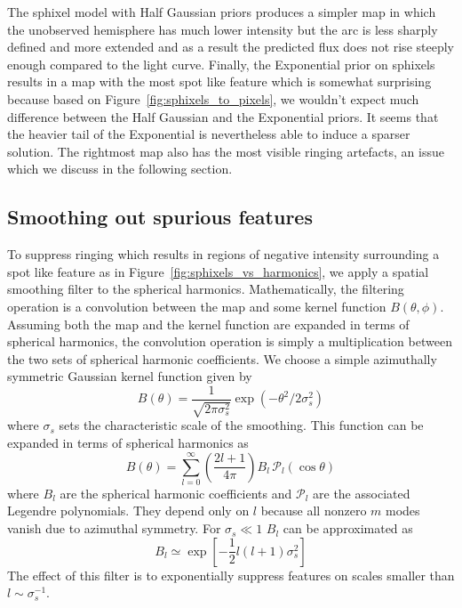 \documentclass[modern]{aastex62}
\begin{document}
The sphixel model with Half Gaussian priors produces a simpler map in which the unobserved hemisphere has much lower intensity but the arc is less sharply defined and more extended and as a result the predicted flux does not rise steeply enough compared to the light curve.
Finally, the Exponential prior on sphixels results in a map with the most spot like feature 
which is somewhat surprising because based on Figure~\ref{fig:sphixels_to_pixels}, we wouldn't expect much difference between the Half Gaussian and the Exponential priors.
It seems that the heavier tail of the Exponential is nevertheless able to induce a sparser solution.
The rightmost map also has the most visible ringing artefacts, an issue which we discuss in the following section.

\subsection{Smoothing out spurious features}
\label{ssec:spurious_features}
To suppress ringing which results in regions of negative intensity surrounding a spot like feature as in Figure~\ref{fig:sphixels_vs_harmonics}, we apply a spatial smoothing filter to the spherical harmonics.
Mathematically, the filtering operation is a convolution between the map and some kernel function $B(\theta,\phi)$.
Assuming both the map and the kernel function are expanded in terms of spherical harmonics, the convolution operation is simply a multiplication between the two sets of spherical harmonic coefficients.
We choose a simple azimuthally symmetric Gaussian kernel function given by
\begin{equation}
    B(\theta)=\frac{1}{\sqrt{2 \pi \sigma_s^{2}}}\exp \left(-\theta^{2} / 2 \sigma_s^{2}\right)
\end{equation}
where $\sigma_s$ sets the characteristic scale of the smoothing.
This function can be expanded in terms of spherical harmonics as
\begin{equation}
    B(\theta)=\sum_{l=0}^{\infty}\left(\frac{2 l+1}{4 \pi}\right) B_{l} \,\mathcal{P}_{l}(\cos \theta)
\end{equation}
where $B_l$ are the spherical harmonic coefficients and $\mathcal{P}_l$ are the associated Legendre polynomials.
They depend only on $l$ because all nonzero $m$ modes vanish due to azimuthal symmetry.
For $\sigma_s\ll 1$ $B_l$ can be approximated as \citep{seon2007,white1995}
\begin{equation}
    B_l\simeq \exp\left[-\frac{1}{2}l(l+1)\sigma_s^2\right]
\end{equation}
The effect of this filter is to exponentially suppress features on scales smaller than $l\sim \sigma_s^{-1}$.
\end{document}
